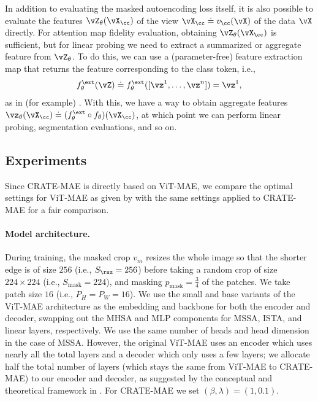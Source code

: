 \documentclass[../../book-main.tex]{subfiles}
\begin{document}
In addition to evaluating the masked autoencoding loss itself, it is also possible to evaluate the features \(\vZ_{\theta}(\vX_{\cc})\) of the view \(\vX_{\cc} \doteq v_{\cc}(\vX)\) of the data \(\vX\) directly. For attention map fidelity evaluation, obtaining \(\vZ_{\theta}(\vX_{\cc})\) is sufficient, but for linear probing we need to extract a summarized or aggregate feature from \(\vZ_{\theta}\). To do this, we can use a (parameter-free) feature extraction map that returns the feature corresponding to the class token, i.e.,
\begin{equation}
    f_{\theta}^{\ext}(\vZ) \doteq f_{\theta}^{\ext}([\vz^{1}, \dots, \vz^{n}]) = \vz^{1},
\end{equation}
as in (for example) . With this, we have a way to obtain aggregate features \(\vz_{\theta}(\vX_{\cc}) \doteq (f_{\theta}^{\ext} \circ f_{\theta})(\vX_{\cc})\), at which point we can perform linear probing, segmentation evaluations, and so on.

\subsection{Experiments}\label{sub:image_completion_experiments}

Since CRATE-MAE is directly based on ViT-MAE, we compare the optimal settings for ViT-MAE as given by \citep{he2022masked} with the same settings applied to CRATE-MAE for a fair comparison.

\paragraph{Model architecture.} During training, the masked crop \(v_{m}\) resizes the whole image so that the shorter edge is of size \(256\) (i.e., \(S_{\rsz} = 256\)) before taking a random crop of size \(224 \times 224\) (i.e., \(S_{\mathrm{mask}} = 224\)), and masking \(p_{\mathrm{mask}} = \frac{3}{4}\) of the patches. We take patch size \(16\) (i.e., \(P_{H} = P_{W} = 16\)). We use the small and base variants of the ViT-MAE architecture as the embedding and backbone for both the encoder and decoder, swapping out the MHSA and MLP components for MSSA, ISTA, and linear layers, respectively. We use the same number of heads and head dimension in the case of MSSA. However, the original ViT-MAE uses an encoder which uses nearly all the total layers and a decoder which only uses a few layers; we allocate half the total number of layers (which stays the same from ViT-MAE to CRATE-MAE) to our encoder and decoder, as suggested by the conceptual and theoretical framework in . For CRATE-MAE we set \((\beta, \lambda) = (1, 0.1)\).
\end{document}

